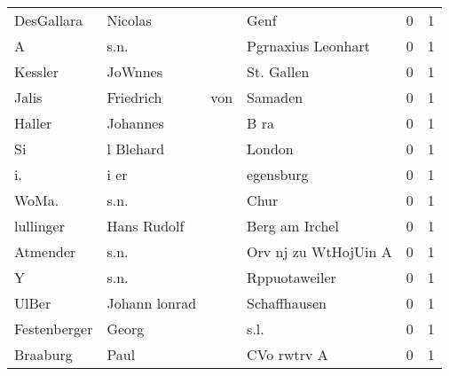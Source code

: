 \begin{center}
\begin{tiny}
\begin{longtabu}{llllrr}
               DesGallara &                            Nicolas &             &                                        Genf &          0 &         1 \\
                        A &                               s.n. &             &                          Pgrnaxius Leonhart &          0 &         1 \\
                  Kessler &                            JoWnnes &             &                                  St. Gallen &          0 &         1 \\
                    Jalis &                          Friedrich &         von &                                     Samaden &          0 &         1 \\
                   Haller &                           Johannes &             &                                        B ra &          0 &         1 \\
                       Si &                          l Blehard &             &                                      London &          0 &         1 \\
                       i. &                               i er &             &                                   egensburg &          0 &         1 \\
                    WoMa. &                               s.n. &             &                                        Chur &          0 &         1 \\
                lullinger &                        Hans Rudolf &             &                              Berg am Irchel &          0 &         1 \\
                 Atmender &                               s.n. &             &                        Orv nj zu WtHojUin A &          0 &         1 \\
                        Y &                               s.n. &             &                               Rppuotaweiler &          0 &         1 \\
                    UlBer &                      Johann lonrad &             &                                Schaffhausen &          0 &         1 \\
             Festenberger &                              Georg &             &                                        s.l. &          0 &         1 \\
                 Braaburg &                               Paul &             &                                 CVo rwtrv A &          0 &         1 \\

\end{longtabu}
\end{tiny}
\end{center}
